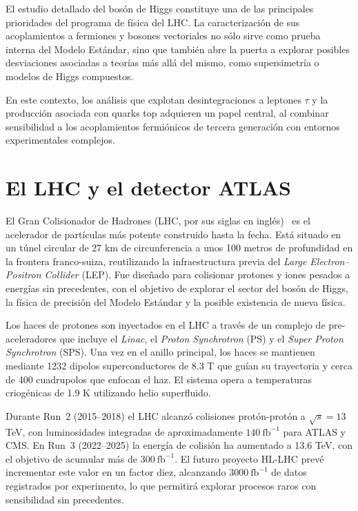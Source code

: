 El estudio detallado del bosón de Higgs constituye una de las principales prioridades del programa de física del LHC. La caracterización de sus acoplamientos a fermiones y bosones vectoriales no sólo sirve como prueba interna del Modelo Estándar, sino que también abre la puerta a explorar posibles desviaciones asociadas a teorías más allá del mismo, como supersimetría o modelos de Higgs compuestos.  

En este contexto, los análisis que explotan desintegraciones a leptones $\tau$ y la producción asociada con quarks top adquieren un papel central, al combinar sensibilidad a los acoplamientos fermiónicos de tercera generación con entornos experimentales complejos. 


\section*{El LHC y el detector ATLAS}

El Gran Colisionador de Hadrones (LHC, por sus siglas en inglés)~\cite{Evans:1129806, Bruning:782076} es el acelerador de partículas más potente construido hasta la fecha. Está situado en un túnel circular de 27 km de circunferencia a unos 100 metros de profundidad en la frontera franco-suiza, reutilizando la infraestructura previa del \textit{Large Electron–Positron Collider} (LEP). Fue diseñado para colisionar protones y iones pesados a energías sin precedentes, con el objetivo de explorar el sector del bosón de Higgs, la física de precisión del Modelo Estándar y la posible existencia de nueva física.

Los haces de protones son inyectados en el LHC a través de un complejo de pre-aceleradores que incluye el \textit{Linac}, el \textit{Proton Synchrotron} (PS) y el \textit{Super Proton Synchrotron} (SPS). Una vez en el anillo principal, los haces se mantienen mediante 1232 dipolos superconductores de 8.3 T que guían su trayectoria y cerca de 400 cuadrupolos que enfocan el haz. El sistema opera a temperaturas criogénicas de 1.9 K utilizando helio superfluido. 

Durante Run~2 (2015–2018) el LHC alcanzó colisiones protón-protón a $\sqrt{s} = 13$ TeV, con luminosidades integradas de aproximadamente $140~\text{fb}^{-1}$ para ATLAS y CMS. En Run~3 (2022–2025) la energía de colisión ha aumentado a 13.6 TeV, con el objetivo de acumular más de $300~\text{fb}^{-1}$. El futuro proyecto HL-LHC prevé incrementar este valor en un factor diez, alcanzando $3000~\text{fb}^{-1}$ de datos registrados por experimento, lo que permitirá explorar procesos raros con sensibilidad sin precedentes.

